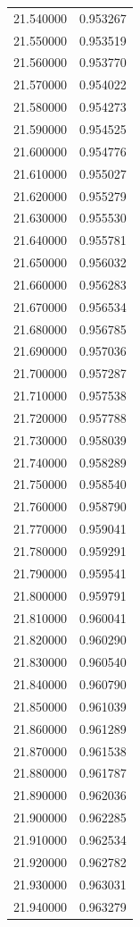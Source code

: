 \begin{tabular}{rr}
21.540000 & 0.953267 \\
21.550000 & 0.953519 \\
21.560000 & 0.953770 \\
21.570000 & 0.954022 \\
21.580000 & 0.954273 \\
21.590000 & 0.954525 \\
21.600000 & 0.954776 \\
21.610000 & 0.955027 \\
21.620000 & 0.955279 \\
21.630000 & 0.955530 \\
21.640000 & 0.955781 \\
21.650000 & 0.956032 \\
21.660000 & 0.956283 \\
21.670000 & 0.956534 \\
21.680000 & 0.956785 \\
21.690000 & 0.957036 \\
21.700000 & 0.957287 \\
21.710000 & 0.957538 \\
21.720000 & 0.957788 \\
21.730000 & 0.958039 \\
21.740000 & 0.958289 \\
21.750000 & 0.958540 \\
21.760000 & 0.958790 \\
21.770000 & 0.959041 \\
21.780000 & 0.959291 \\
21.790000 & 0.959541 \\
21.800000 & 0.959791 \\
21.810000 & 0.960041 \\
21.820000 & 0.960290 \\
21.830000 & 0.960540 \\
21.840000 & 0.960790 \\
21.850000 & 0.961039 \\
21.860000 & 0.961289 \\
21.870000 & 0.961538 \\
21.880000 & 0.961787 \\
21.890000 & 0.962036 \\
21.900000 & 0.962285 \\
21.910000 & 0.962534 \\
21.920000 & 0.962782 \\
21.930000 & 0.963031 \\
21.940000 & 0.963279 \\

\end{tabular}
